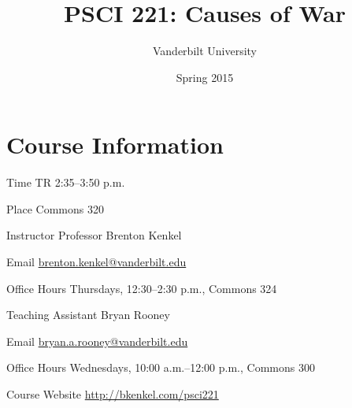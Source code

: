 \documentclass[nohyper]{tufte-handout}
\title{PSCI 221: Causes of War}
\author{Vanderbilt University}
\date{Spring 2015}
\begin{document}
\maketitle

\section{Course Information}

\begin{compactdesc}
  \item[Time] TR 2:35--3:50 p.m.
  \item[Place] Commons 320
  \item[Instructor] Professor Brenton Kenkel
  \begin{compactdesc}
    \item[Email] \href{mailto:brenton.kenkel@vanderbilt.edu}{brenton.kenkel@vanderbilt.edu}
    \item[Office Hours] Thursdays, 12:30--2:30 p.m., Commons 324
  \end{compactdesc}
  \item[Teaching Assistant] Bryan Rooney
  \begin{compactdesc}
    \item[Email] \href{mailto:bryan.a.rooney@vanderbilt.edu}{bryan.a.rooney@vanderbilt.edu}
    \item[Office Hours] Wednesdays, 10:00 a.m.--12:00 p.m., Commons 300
  \end{compactdesc}
  \item[Course Website] \url{http://bkenkel.com/psci221}
\end{compactdesc}


\end{document}
